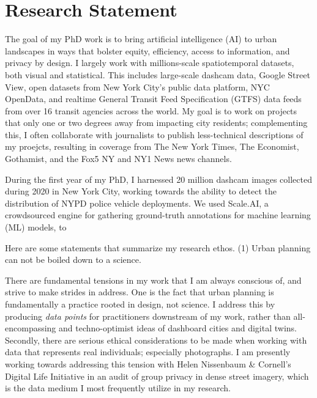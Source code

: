 \documentclass[11pt,letterpaper]{report}
\begin{document}
    \section*{Research Statement}

    \onehalfspacing
    
    The goal of my PhD work is to bring artificial intelligence (AI) to urban landscapes in ways that bolster equity, efficiency, access to information, and privacy by design. I largely work with millions-scale spatiotemporal datasets, both visual and statistical. This includes large-scale dashcam data, Google Street View, open datasets from New York City's public data platform, NYC OpenData, and realtime General Transit Feed Specification (GTFS) data feeds from over 16 transit agencies across the world. My goal is to work on projects that only one or two degrees away from impacting city residents; complementing this, I often collaborate with journalists to publish less-technical descriptions of my proejcts, resulting in coverage from The New York Times, The Economist, Gothamist, and the Fox5 NY and NY1 News news channels. 

    During the first year of my PhD, I harnessed 20 million dashcam images collected during 2020 in New York City, working towards the ability to detect the distribution of NYPD police vehicle deployments. We used Scale.AI, a crowdsourced engine for gathering ground-truth annotations for machine learning (ML) models, to 

    Here are some statements that summarize my research ethos. (1) Urban planning can not be boiled down to a science. 

    There are fundamental tensions in my work that I am always conscious of, and strive to make strides in address. One is the fact that urban planning is fundamentally a practice rooted in design, not science. I address this by producing \textit{data points} for practitioners downstream of my work, rather than all-encompassing and techno-optimist ideas of dashboard cities and digital twins. Secondly, there are serious ethical considerations to be made when working with data that represents real individuals; especially photographs. I am presently working towards addressing this tension with Helen Nissenbaum \& Cornell's Digital Life Initiative in an audit of group privacy in dense street imagery, which is the data medium I most frequently utilize in my research. 

    \lipsum[1]

    \singlespacing
\end{document}
